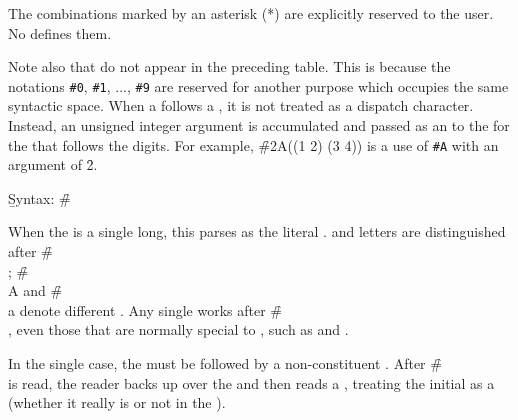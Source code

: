 The combinations marked by an asterisk (*) are explicitly reserved to the
user.  No  defines them.

Note also that  do not appear in the preceding table.  This is
because the notations {\tt \#0}, {\tt \#1}, ..., {\tt \#9} are
reserved for another purpose which occupies the same syntactic space.
When a  follows a ,
it is not treated as a dispatch character.
Instead, an unsigned integer argument is accumulated 
and passed as an  to the  
for the  that follows the digits.
For example,
\f{\#2A((1 2) (3 4))} is a use of {\tt \#A} with an argument of \f{2}.



\b{Syntax:} \f{\#\\}


When the   is a single  long, 
this parses as the literal  .
 and  letters are distinguished after \f{\#\\};
\f{\#\\A} and \f{\#\\a} denote different  .
Any single  works after \f{\#\\},
even those that are normally special to , 
such as  and .

In the single  case,
the  must be followed by a non-constituent .
After \f{\#\\} is read,
the reader backs up over the  and then reads a ,
treating the initial  as a  
(whether it really is or not in the ).


